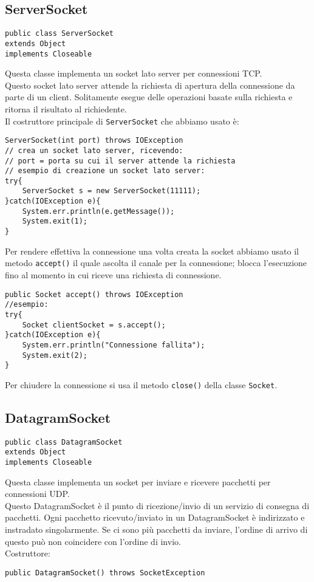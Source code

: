 \documentclass[a4paper, titlepage]{article}
\begin{document}
		\subsection{ServerSocket}
		\begin{lstlisting}
public class ServerSocket
extends Object
implements Closeable
		\end{lstlisting}
		Questa classe implementa un socket lato server per connessioni TCP.\\
		Questo socket lato server attende la richiesta di apertura 
		della connessione da parte di un client. 
		Solitamente esegue delle operazioni basate sulla richiesta e ritorna il risultato 
		al richiedente.\\
		Il costruttore principale di \lstinline!ServerSocket! che abbiamo usato è:
		\begin{lstlisting}[]
ServerSocket(int port) throws IOException
// crea un socket lato server, ricevendo:
// port = porta su cui il server attende la richiesta
// esempio di creazione un socket lato server:
try{
	ServerSocket s = new ServerSocket(11111);
}catch(IOException e){
	System.err.println(e.getMessage());
	System.exit(1);
}
		\end{lstlisting}		
		Per rendere effettiva la connessione una volta creata la socket abbiamo usato il metodo
		\lstinline!accept()! il quale ascolta il canale per la connessione; blocca l'esecuzione
		fino al momento in cui riceve una richiesta di connessione.
		\begin{lstlisting}
public Socket accept() throws IOException
//esempio:
try{
	Socket clientSocket = s.accept();
}catch(IOException e){
	System.err.println("Connessione fallita");
	System.exit(2);
}
		\end{lstlisting}
		Per chiudere la connessione si usa il metodo \lstinline!close()! della classe 
		\lstinline!Socket!.
		
		\bigskip
		
		\subsection{DatagramSocket}
		\begin{lstlisting}
public class DatagramSocket
extends Object
implements Closeable
		\end{lstlisting}
		Questa classe implementa un socket per inviare e ricevere pacchetti per connessioni UDP.\\
		Questo DatagramSocket è il punto di ricezione/invio di un servizio di consegna di pacchetti.
		Ogni pacchetto ricevuto/inviato in un DatagramSocket è indirizzato e instradato singolarmente.
		Se ci sono più pacchetti da inviare, l'ordine di arrivo di questo può non coincidere
		con l'ordine di invio.\\
		Costruttore:
		\begin{lstlisting}
public DatagramSocket() throws SocketException
		\end{lstlisting}
\end{document}
